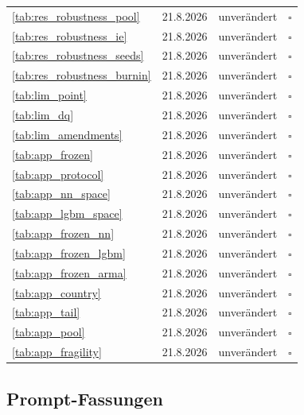 \begin{tabular}{@{}p{6.2cm}llc@{}}
\cref{tab:res_robustness_pool}        & 21.8.2026 & unver\"andert & $\square$ \\
\cref{tab:res_robustness_ie}          & 21.8.2026 & unver\"andert & $\square$ \\
\cref{tab:res_robustness_seeds}       & 21.8.2026 & unver\"andert & $\square$ \\
\cref{tab:res_robustness_burnin}      & 21.8.2026 & unver\"andert & $\square$ \\
\cref{tab:lim_point}                  & 21.8.2026 & unver\"andert & $\square$ \\
\cref{tab:lim_dq}                     & 21.8.2026 & unver\"andert & $\square$ \\
\cref{tab:lim_amendments}             & 21.8.2026 & unver\"andert & $\square$ \\
\cref{tab:app_frozen}                 & 21.8.2026 & unver\"andert & $\square$ \\
\cref{tab:app_protocol}               & 21.8.2026 & unver\"andert & $\square$ \\
\cref{tab:app_nn_space}               & 21.8.2026 & unver\"andert & $\square$ \\
\cref{tab:app_lgbm_space}             & 21.8.2026 & unver\"andert & $\square$ \\
\cref{tab:app_frozen_nn}              & 21.8.2026 & unver\"andert & $\square$ \\
\cref{tab:app_frozen_lgbm}            & 21.8.2026 & unver\"andert & $\square$ \\
\cref{tab:app_frozen_arma}            & 21.8.2026 & unver\"andert & $\square$ \\
\cref{tab:app_country}                & 21.8.2026 & unver\"andert & $\square$ \\
\cref{tab:app_tail}                   & 21.8.2026 & unver\"andert & $\square$ \\
\cref{tab:app_pool}                   & 21.8.2026 & unver\"andert & $\square$ \\
\cref{tab:app_fragility}              & 21.8.2026 & unver\"andert & $\square$ \\
\bottomrule
\end{tabular}

\subsection*{Prompt-Fassungen}

